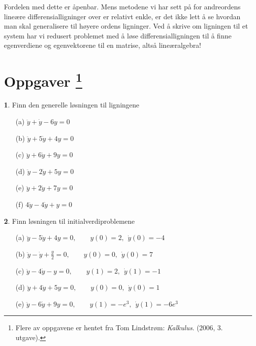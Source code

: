 \documentclass{article}
\theoremstyle{definition}
\newtheorem{oppg}{}
\theoremstyle{remark}
\begin{document}
\begin{multicols*}{2}
Fordelen med dette er åpenbar. Mens metodene vi har sett på for andreordens lineære differensialligninger over er relativt enkle, er det ikke lett å se hvordan man skal generalisere til høyere ordens ligninger. Ved å skrive om ligningen til et system har vi redusert problemet med å løse differensialligningen til å finne egenverdiene og egenvektorene til en matrise, altså lineæralgebra!

\newpage

\section*{Oppgaver \footnote{Flere av oppgavene er hentet fra Tom Lindstrøm: \textit{Kalkulus}. (2006, 3. utgave).}}

\begin{oppg}
  Finn den generelle løsningen til ligningene
  \begin{multicols*}{2}
    \begin{itemize}
      \item[(a)] $\ddot{y} + \dot{y} - 6 y = 0$
      \item[(b)] $\ddot{y} + 5\dot{y} + 4y = 0$
      \item[(c)] $\ddot{y} + 6\dot{y} + 9y = 0$
      \item[(d)] $\ddot{y} - 2\dot{y} + 5y = 0$
      \item[(e)] $\ddot{y} + 2\dot{y} + 7y = 0$
      \item[(f)] $4\ddot{y} - 4\dot{y} + y = 0$  
    \end{itemize}
  \end{multicols*}
\end{oppg}

\begin{oppg}
  Finn løsningen til initialverdiproblemene
  \begin{itemize}
    \item[(a)] $\ddot{y} - 5\dot{y} + 4y = 0, \qquad y(0) = 2,\ \ \dot{y}(0) = -4$
    \item[(b)] $\ddot{y} - \dot{y} + \frac{y}{2} = 0, \qquad y(0) = 0,\ \ \dot{y}(0) = 7$
    \item[(c)] $\ddot{y} - 4\dot{y} - y = 0, \qquad y(1) = 2,\ \ \dot{y}(1) = -1$
    \item[(d)] $\ddot{y} + 4\dot{y} + 5y = 0, \qquad y(0) = 0,\ \ \dot{y}(0) = 1$
    \item[(e)] $\ddot{y} - 6\dot{y} + 9y = 0, \qquad y(1) = -e^3,\ \ \dot{y}(1) = -6e^3$
  \end{itemize}
\end{oppg}


\end{multicols*}
\end{document}
